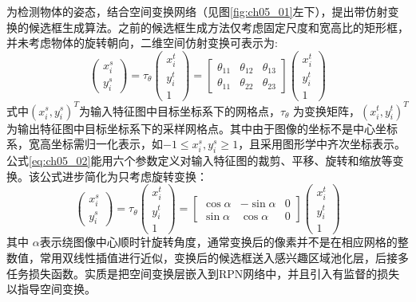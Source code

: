为检测物体的姿态，结合空间变换网络\citep{Jaderberg2015}（见图\ref{fig:ch05_01}左下），提出带仿射变换的候选框生成算法。之前的候选框生成方法仅考虑固定尺度和宽高比的矩形框，并未考虑物体的旋转朝向，二维空间仿射变换可表示为:
\begin{equation} \label{eq:ch05_02}
\begin{pmatrix}
x_{i}^{s}\\ 
y_{i}^{s}
\end{pmatrix} =\tau _{\theta}\begin{pmatrix}
x_{i}^{t}\\ 
y_{i}^{t}\\
1
\end{pmatrix}=\begin{bmatrix}
\theta_{11} &\theta_{12}  &\theta_{13} \\ 
 \theta_{11}&\theta_{22}  & \theta_{23}
\end{bmatrix}\begin{pmatrix}
x_{i}^{t}\\ 
y_{i}^{t}\\
1
\end{pmatrix}
\end{equation}                    
式中$(x_{i}^{s},y_{i}^{s})^T $为输入特征图中目标坐标系下的网格点，$\tau _{\theta}$ 为变换矩阵，$(x_{i}^{t},y_{i}^{t})^T $为输出特征图中目标坐标系下的采样网格点。其中由于图像的坐标不是中心坐标系，宽高坐标需归一化表示，如$-1\leq x_{i}^{s},y_{i}^{s}\geq 1$，且采用图形学中齐次坐标表示。公式\ref{eq:ch05_02}能用六个参数定义对输入特征图的裁剪、平移、旋转和缩放等变换。该公式进步简化为只考虑旋转变换：
\begin{equation} \label{eq:ch05_03}
\begin{pmatrix}
x_{i}^{s}\\ 
y_{i}^{s}
\end{pmatrix} =\tau _{\theta}\begin{pmatrix}
x_{i}^{t}\\ 
y_{i}^{t}\\
1
\end{pmatrix}=\begin{bmatrix}
\cos\alpha &-\sin\alpha  &0 \\ 
 \sin\alpha&\cos\alpha  & 0
\end{bmatrix}\begin{pmatrix}
x_{i}^{t}\\ 
y_{i}^{t}\\
1
\end{pmatrix}
\end{equation}  
其中 $\alpha$表示绕图像中心顺时针旋转角度，通常变换后的像素并不是在相应网格的整数值，常用双线性插值进行近似，变换后的候选框送入感兴趣区域池化层，后接多任务损失函数。实质是把空间变换层嵌入到RPN网络中，并且引入有监督的损失以指导空间变换。
